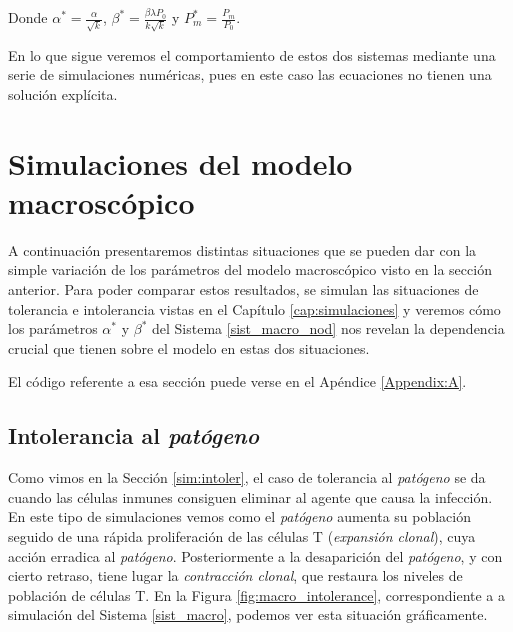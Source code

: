 Donde $\alpha^{*} = \frac{\alpha}{\sqrt k}$, $\beta^{*} = \frac{\beta \lambda P_0}{k \sqrt k}$ y $P_{m}^{*} = \frac{P_m}{P_0}$.

En lo que sigue veremos el comportamiento de estos dos sistemas mediante una serie de simulaciones numéricas, pues en este caso las ecuaciones no tienen una solución explícita.

\section{Simulaciones del modelo macroscópico}

A continuación presentaremos distintas situaciones que se pueden dar con la simple variación de los parámetros del modelo macroscópico visto en la sección anterior. Para poder comparar estos resultados, se simulan las situaciones de tolerancia e intolerancia vistas en el Capítulo \ref{cap:simulaciones} y veremos cómo los parámetros $\alpha^{*}$ y $\beta^{*}$ del Sistema \ref{sist_macro_nod} nos revelan la dependencia crucial que tienen sobre el modelo en estas dos situaciones.

El código referente a esa sección puede verse en el Apéndice \ref{Appendix:A}.



\subsection{Intolerancia al \textit{patógeno}}

Como vimos en la Sección \ref{sim:intoler}, el caso de tolerancia al \textit{patógeno} se da cuando las células inmunes consiguen eliminar al agente que causa la infección. 
En este tipo de simulaciones vemos como el \textit{patógeno} aumenta su población seguido de una rápida proliferación de las células T (\textit{expansión clonal}), cuya acción erradica al \textit{patógeno}. Posteriormente a la desaparición del \textit{patógeno}, y con cierto retraso, tiene lugar la \textit{contracción clonal}, que restaura los niveles de población de células T. En la Figura \ref{fig:macro_intolerance}, correspondiente a a simulación del Sistema \ref{sist_macro}, podemos ver esta situación gráficamente. 

